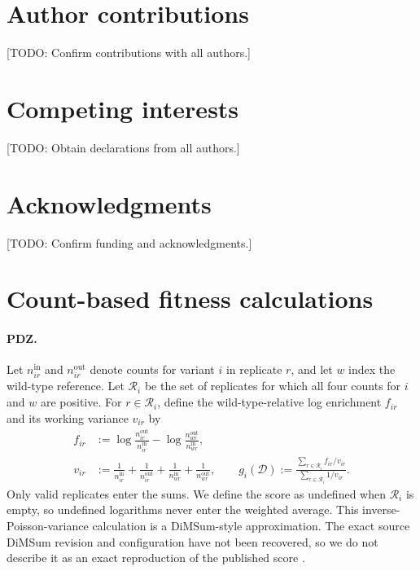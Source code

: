 \documentclass[11pt]{article}
\newcommand{\data}{\mathcal{D}}
\newcommand{\note}[1]{\textcolor{boxrule}{\small[#1]}}
\begin{document}
\section*{Author contributions}
\note{TODO: Confirm contributions with all authors.}

\section*{Competing interests}
\note{TODO: Obtain declarations from all authors.}

\section*{Acknowledgments}
\note{TODO: Confirm funding and acknowledgments.}

\clearpage


\clearpage
\appendix
\renewcommand{\thefigure}{S\arabic{figure}}
\renewcommand{\theHfigure}{supp.\arabic{figure}}
\setcounter{figure}{0}



\section{Count-based fitness calculations}
\label{app:scores}

\paragraph{PDZ.}
Let $n_{ir}^{\mathrm{in}}$ and $n_{ir}^{\mathrm{out}}$ denote counts for
variant $i$ in replicate $r$, and let $w$ index the wild-type reference. Let
$\mathcal R_i$ be the set of replicates for which all four counts for $i$
and $w$ are positive. For $r\in\mathcal R_i$, define the wild-type-relative
log enrichment $f_{ir}$ and its working variance $v_{ir}$ by
\begin{align}
f_{ir}&:=\log\frac{n_{ir}^{\mathrm{out}}}{n_{ir}^{\mathrm{in}}}
-\log\frac{n_{wr}^{\mathrm{out}}}{n_{wr}^{\mathrm{in}}},\\
v_{ir}&:=\frac{1}{n_{ir}^{\mathrm{in}}}+\frac{1}{n_{ir}^{\mathrm{out}}}
+\frac{1}{n_{wr}^{\mathrm{in}}}+\frac{1}{n_{wr}^{\mathrm{out}}},\qquad
g_i(\data):=\frac{\sum_{r\in\mathcal R_i} f_{ir}/v_{ir}}
{\sum_{r\in\mathcal R_i}1/v_{ir}}.
\end{align}
Only valid replicates enter the sums. We define the score as undefined when
$\mathcal R_i$ is empty, so undefined logarithms never enter the weighted
average. This inverse-Poisson-variance
calculation is a DiMSum-style approximation. The exact source DiMSum revision
and configuration have not been recovered, so we do not describe it as an
exact reproduction of the published score \citep{faure2020,zarin2024}.
\end{document}
